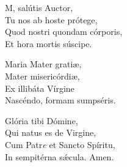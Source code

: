 M, salútis Auctor,\\
Tu nos ab hoste prótege,\\
Quod nostri quondam córporis,\\
Et hora mortis súscipe.

Maria Mater gratiæ,\\
Mater misericórdiæ,\\
Ex illibáta Vírgine\\
Nascéndo, formam sumpséris.

Glória tibi Dómine,\\
Qui natus es de Virgine,\\
Cum Patr\textit{e} et Sancto Spíritu,\\
In sempitérna sǽcula. Amen.